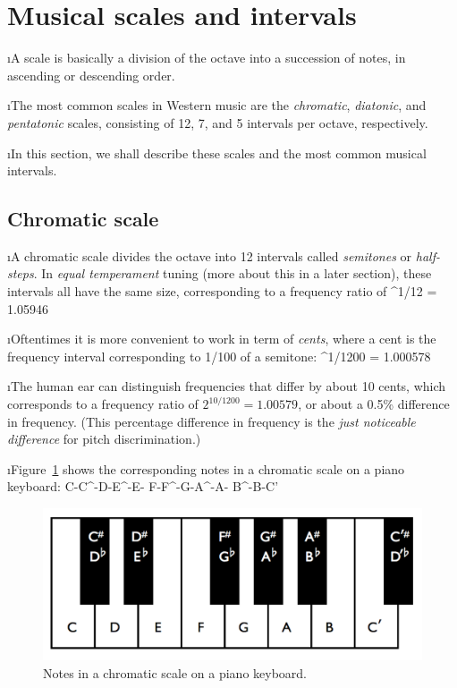 \section{Musical scales and intervals}

\bi

\i A scale is basically a division of the octave 
into a succession of notes, in ascending or descending order.

\i The most common scales in Western music are
the {\em chromatic}, {\em diatonic}, and {\em pentatonic}
scales, consisting of 12, 7, and 5 intervals per octave, 
respectively.

\i In this section, we shall describe these scales and the most
common musical intervals.

\ei

\subsection{Chromatic scale}
\bi

\i A chromatic scale divides the octave into 
12 intervals called {\em semitones} or {\em half-steps}.
In {\em equal temperament} tuning (more about
this in a later section),
these intervals all have
the same size, corresponding to a frequency ratio of 
%
^{1/12} = 1.05946
\ee
%

\i Oftentimes it is more convenient to work in
term of {\em cents}, where a cent is the 
frequency interval corresponding to 1/100 of a semitone:
%
^{1/1200} = 1.000578
\ee
%

\i The human ear can distinguish frequencies
that differ by about 10 cents, which corresponds to
a frequency ratio of $2^{10/1200}=1.00579$,
or about a 0.5\% difference in frequency.
(This percentage difference in frequency is the 
{\em just noticeable difference} for pitch discrimination.)

\i Figure~\ref{f:chromatic-scale-keyboard} shows the
corresponding notes in a chromatic scale on 
a piano keyboard:
%
\be
{\rm C}-{\rm C}^\sharp-{\rm D}-{\rm E}^\flat-{\rm E}-%
{\rm F}-{\rm F}^\sharp-{\rm G}-{\rm A}^\flat-{\rm A}-%
{\rm B}^\flat-{\rm B}-{\rm C}'
\nonumber
\ee
%
\begin{figure}[htbp]
\begin{center}
\includegraphics[width=.7\textwidth]{octave-keys}
\caption{Notes in a chromatic scale on a piano keyboard.}
\label{f:chromatic-scale-keyboard}
\end{center}
\end{figure}
%

